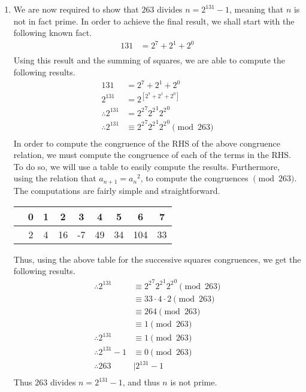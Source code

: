 \documentclass[a4paper]{article}
\begin{document}
\begin{enumerate}
\begin{enumerate}
		\item We are now required to show that $\displaystyle{263}$ divides $\displaystyle{n = 2^{131}-1}$, meaning that $\displaystyle{n}$ is not in fact prime. In order to achieve the final result, we shall start with the following known fact.
		\begin{align*}
		131 & = 2^7 + 2^1 + 2^0\\
		\end{align*}
		Using this result and the summing of squares, we are able to compute the following results.
		\begin{align*}
		131 & = 2^7 + 2^1 + 2^0\\
		2^{131} & = 2^{\left[2^7 + 2^1 + 2^0\right]}\\
		\therefore 2^{131} & = {{2^2}^7}{{2^2}^1}{2^2}^0\\
		\therefore 2^{131} & \equiv {{2^2}^7}{{2^2}^1}{2^2}^0 \pmod{263}\\
		\end{align*}
		In order to compute the congruence of the RHS of the above congruence relation, we must compute the congruence of each of the terms in the RHS. To do so, we will use a table to easily compute the results. Furthermore, using the relation that $\displaystyle{a_{n+1} = {a_n}^2}$, to compute the congruences $\displaystyle{\pmod{263}}$. The computations are fairly simple and straightforward.
		\begin{center}
		\begin{tabular}{c|c c c c c c c c}
		\text{n} & 0 & 1 & 2 & 3 & 4 & 5 & 6 & 7 \\
		\hline
		\text{$\displaystyle{{2^2}^n}$} & 2 & 4 & 16 & -7 & 49 & 34 & 104 & 33
		\end{tabular}
		\end{center}
		Thus, using the above table for the successive squares congruences, we get the following results. 
		\begin{align*}
		\therefore 2^{131} & \equiv {{2^2}^7}{{2^2}^1}{2^2}^0 \pmod{263}\\
		& \equiv 33\cdot4\cdot2 \pmod{263}\\
		& \equiv 264 \pmod{263}\\
		& \equiv 1 \pmod{263}\\
		\therefore 2^{131} & \equiv 1 \pmod{263}\\
		\therefore 2^{131} - 1 & \equiv 0 \pmod{263}\\
		\therefore 263 & \mid 2^{131} - 1\\
		\end{align*}
		Thus $\displaystyle{263}$ divides $\displaystyle{n = 2^{131}-1}$, and thus $\displaystyle{n}$ is not prime.

	\end{enumerate}

\end{enumerate}
\end{document}
